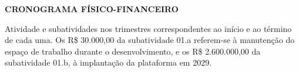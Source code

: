\documentclass[12pt,a4paper]{article}
\newcommand{\secao}[1]{%
  \par\vspace{\dimexpr16pt-\parskip\relax}%
  {\noindent\bfseries\color{azulTitulo}\fontsize{13}{16}\selectfont #1}%
  \par\vspace{\dimexpr8pt-\parskip\relax}%
}
\begin{document}
%
%
%
\secao{CRONOGRAMA FÍSICO-FINANCEIRO}

Atividade e subatividades nos trimestres correspondentes ao início e ao término de cada uma. Os R\$ 30.000,00 da subatividade 01.a referem-se à manutenção do espaço de trabalho durante o desenvolvimento, e os R\$ 2.600.000,00 da subatividade 01.b, à implantação da plataforma em 2029.
\end{document}
